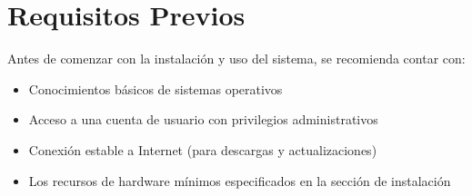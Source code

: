 \section{Requisitos Previos}

Antes de comenzar con la instalación y uso del sistema, se recomienda contar con:

\begin{itemize}
    \item Conocimientos básicos de sistemas operativos
    \item Acceso a una cuenta de usuario con privilegios administrativos
    \item Conexión estable a Internet (para descargas y actualizaciones)
    \item Los recursos de hardware mínimos especificados en la sección de instalación
\end{itemize}
